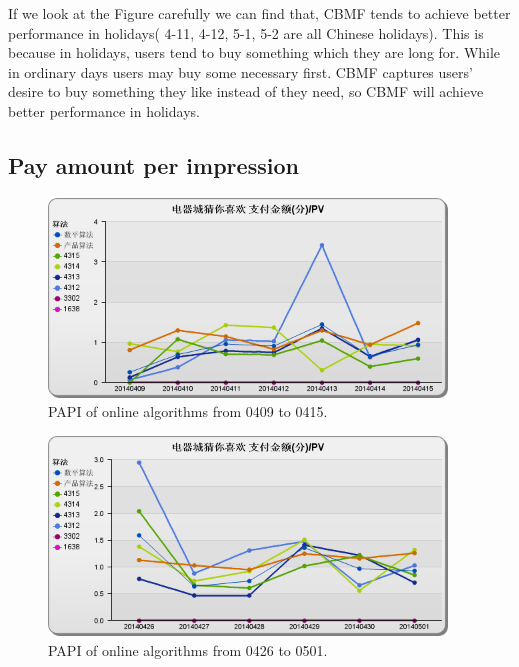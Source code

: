 If we look at the Figure carefully we can find that, CBMF tends to achieve better performance in holidays( 4-11, 4-12, 5-1, 5-2 are all Chinese holidays). This is because in holidays, users tend to buy something which they are long for. While in ordinary days users may buy some necessary first. CBMF captures users' desire to buy something they like instead of they need, so CBMF will achieve better performance in holidays.


\subsection{Pay amount per impression}

\begin{figure}
\begin{center}

\includegraphics[width=400px]{fig/yixunexp/PAPI0415.png}
\caption{\label{fig:papi0415} PAPI of online algorithms  from 0409 to 0415.}
\end{center}
\end{figure}

\begin{figure}
\begin{center}

\includegraphics[width=400px]{fig/yixunexp/PAPI0421.png}
\caption{\label{fig:papi0501} PAPI of online algorithms  from 0426 to 0501.}
\end{center}
\end{figure}


